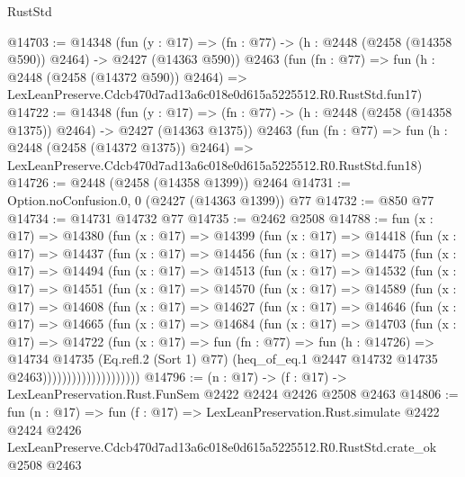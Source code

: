 \begin{lexlean}{RustStd}
\begin{coremodule}
@14703 := @14348
    (fun (y : @17) => (fn : @77) -> (h : @2448 (@2458 (@14358 @590)) @2464) -> @2427 (@14363 @590))
    @2463
    (fun (fn : @77) =>
    fun (h : @2448 (@2458 (@14372 @590)) @2464) =>
    LexLeanPreserve.Cdcb470d7ad13a6c018e0d615a5225512.R0.RustStd.fun17)
@14722 := @14348
    (fun (y : @17) =>
    (fn : @77) -> (h : @2448 (@2458 (@14358 @1375)) @2464) -> @2427 (@14363 @1375))
    @2463
    (fun (fn : @77) =>
    fun (h : @2448 (@2458 (@14372 @1375)) @2464) =>
    LexLeanPreserve.Cdcb470d7ad13a6c018e0d615a5225512.R0.RustStd.fun18)
@14726 := @2448 (@2458 (@14358 @1399)) @2464
@14731 := Option.noConfusion.{0, 0} (@2427 (@14363 @1399)) @77
@14732 := @850 @77
@14734 := @14731 @14732 @77
@14735 := @2462 @2508
@14788 := fun (x : @17) =>
  @14380
    (fun (x : @17) =>
    @14399
      (fun (x : @17) =>
      @14418
        (fun (x : @17) =>
        @14437
          (fun (x : @17) =>
          @14456
            (fun (x : @17) =>
            @14475
              (fun (x : @17) =>
              @14494
                (fun (x : @17) =>
                @14513
                  (fun (x : @17) =>
                  @14532
                    (fun (x : @17) =>
                    @14551
                      (fun (x : @17) =>
                      @14570
                        (fun (x : @17) =>
                        @14589
                          (fun (x : @17) =>
                          @14608
                            (fun (x : @17) =>
                            @14627
                              (fun (x : @17) =>
                              @14646
                                (fun (x : @17) =>
                                @14665
                                  (fun (x : @17) =>
                                  @14684
                                    (fun (x : @17) =>
                                    @14703
                                      (fun (x : @17) =>
                                      @14722
                                        (fun (x : @17) =>
                                        fun (fn : @77) =>
                                        fun (h : @14726) =>
                                        @14734
                                          @14735
                                          (Eq.refl.{2} (Sort 1) @77)
                                          (heq_of_eq.{1}
                                            @2447
                                            @14732
                                            @14735
                                            @2463))))))))))))))))))))
@14796 := (n : @17) -> (f : @17) -> LexLeanPreservation.Rust.FunSem @2422 @2424 @2426 @2508 @2463
@14806 := fun (n : @17) =>
  fun (f : @17) =>
  LexLeanPreservation.Rust.simulate
    @2422
    @2424
    @2426
    LexLeanPreserve.Cdcb470d7ad13a6c018e0d615a5225512.R0.RustStd.crate_ok
    @2508
    @2463
\end{coremodule}
\end{lexlean}
